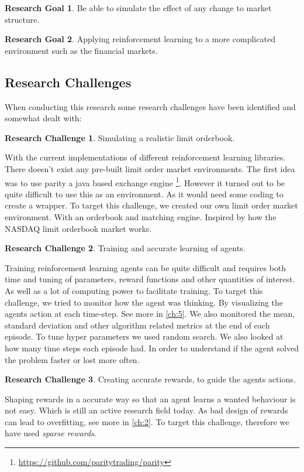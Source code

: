 \documentclass{kththesis}
\theoremstyle{definition}
\newtheorem{RG}{Research Goal}[section]
\newtheorem{RC}{Research Challenge}[section]
\begin{document}
\begin{RG}
Be able to simulate the effect of any change to market structure.
\end{RG}

\begin{RG}
Applying reinforcement learning to a more complicated environment such as the financial markets.
\end{RG}

\subsection{Research Challenges}
When conducting this research some research challenges have been identified and somewhat dealt with:
\begin{RC}
Simulating a realistic limit orderbook.
\end{RC}
With the current implementations of different reinforcement learning libraries. There doesn't exist any pre-built limit order market environments. The first idea was to use parity a java based exchange engine \footnote{\url{https://github.com/paritytrading/parity}}. However it turned out to be quite difficult to use this as an environment. As it would need some coding to create a wrapper. To target this challenge, we created our own limit order market environment. With an orderbook and matching engine. Inspired by how the NASDAQ limit orderbook market works.

\begin{RC}
Training and accurate learning of agents. 
\end{RC}

Training reinforcement learning agents can be quite difficult and requires both time and tuning of parameters, reward functions and other quantities of interest. 
\newpage
As well as a lot of computing power to facilitate training. To target this challenge, we tried to monitor how the agent was thinking. By visualizing the agents action at each time-step. See more in \autoref{ch:5}. We also monitored the mean, standard deviation and other algorithm related metrics at the end of each episode. To tune hyper parameters we used random search. We also looked at how many time steps each episode had. In order to understand if the agent solved the problem faster or lost more often.

\begin{RC}
Creating accurate rewards, to guide the agents actions.
\end{RC}
Shaping rewards in a accurate way so that an agent learns a wanted behaviour is not easy. Which is still an active research field today. As bad design of rewards can lead to overfitting, see more in \autoref{ch:2}. To target this challenge, therefore we have used \textit{sparse rewards}.
\end{document}
